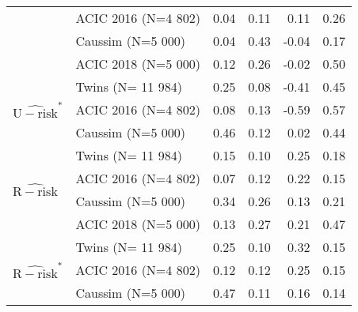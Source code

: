 \begin{tabular}{llrrrr}
    \cline{2-6}
                                                                 & ACIC 2016
    (N=4 802)                                                    & 0.04      & 0.11   & 0.11  & 0.26         \\
    \cline{2-6}
                                                                 & Caussim
    (N=5 000)                                                    & 0.04      & 0.43   & -0.04 & 0.17         \\
    \cline{2-6}
                                                                 & ACIC 2018
    (N=5 000)                                                    & 0.12      & 0.26   & -0.02 & 0.50         \\
    \cline{1-6} \cline{2-6}
    \multirow[c]{3}{*}{$\widehat{\mathrm{U-risk}}^{*}$}          & Twins
    (N= 11 984)                                                  & 0.25      & 0.08   & -0.41 & 0.45         \\
    \cline{2-6}
                                                                 & ACIC 2016
    (N=4 802)                                                    & 0.08      & 0.13   & -0.59 & 0.57         \\
    \cline{2-6}
                                                                 & Caussim
    (N=5 000)                                                    & 0.46      & 0.12   & 0.02  & 0.44         \\
    \cline{1-6} \cline{2-6}
    \multirow[c]{4}{*}{$\widehat{\mathrm{R-risk}}$}              & Twins
    (N= 11 984)                                                  & 0.15      & 0.10   & 0.25  & 0.18         \\
    \cline{2-6}
                                                                 & ACIC 2016
    (N=4 802)                                                    & 0.07      & 0.12   & 0.22  & 0.15         \\
    \cline{2-6}
                                                                 & Caussim
    (N=5 000)                                                    & 0.34      & 0.26   & 0.13  & 0.21         \\
    \cline{2-6}
                                                                 & ACIC 2018
    (N=5 000)                                                    & 0.13      & 0.27   & 0.21  & 0.47         \\
    \cline{1-6} \cline{2-6}
    \multirow[c]{3}{*}{$\widehat{\mathrm{R-risk}}^{*}$}          & Twins
    (N= 11 984)                                                  & 0.25      & 0.10   & 0.32  & 0.15         \\
    \cline{2-6}
                                                                 & ACIC 2016
    (N=4 802)                                                    & 0.12      & 0.12   & 0.25  & 0.15         \\
    \cline{2-6}
                                                                 & Caussim
    (N=5 000)                                                    & 0.47      & 0.11   & 0.16  & 0.14         \\
    \cline{1-6} \cline{2-6}
    \bottomrule
\end{tabular}
